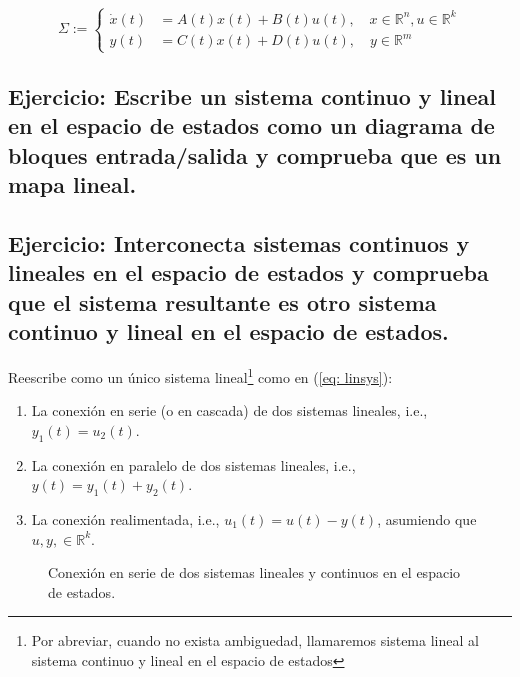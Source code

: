 \begin{equation}
	\Sigma := \begin{cases}
	\dot x(t) &= A(t)x(t) + B(t)u(t), \quad x\in\mathbb{R}^n, u\in\mathbb{R}^k \\
	y(t) &= C(t)x(t) + D(t)u(t), \quad y\in\mathbb{R}^m
	\end{cases}
	\label{eq: linsys}
\end{equation}

\subsection{Ejercicio: Escribe un sistema continuo y lineal en el espacio de estados como un diagrama de bloques entrada/salida y comprueba que es un mapa lineal.}

\subsection{Ejercicio: Interconecta sistemas continuos y lineales en el espacio de estados y comprueba que el sistema resultante es otro sistema continuo y lineal en el espacio de estados.}

Reescribe como un único sistema lineal\footnote{Por abreviar, cuando no exista ambiguedad, llamaremos sistema lineal al sistema continuo y lineal en el espacio de estados} como en (\ref{eq: linsys}):

\begin{enumerate}
	\item La conexión en serie (o en cascada) de dos sistemas lineales, i.e., $y_1(t) = u_2(t)$.
	\item La conexión en paralelo de dos sistemas lineales, i.e., $y(t) = y_1(t) + y_2(t)$.
	\item La conexión realimentada, i.e., $u_1(t) = u(t) - y(t)$, asumiendo que $u, y, \in\mathbb{R}^k$.
\end{enumerate}

\begin{figure}
\centering
{}
	\caption{Conexión en serie de dos sistemas lineales y continuos en el espacio de estados.}
	\label{fig: series}
\end{figure}

